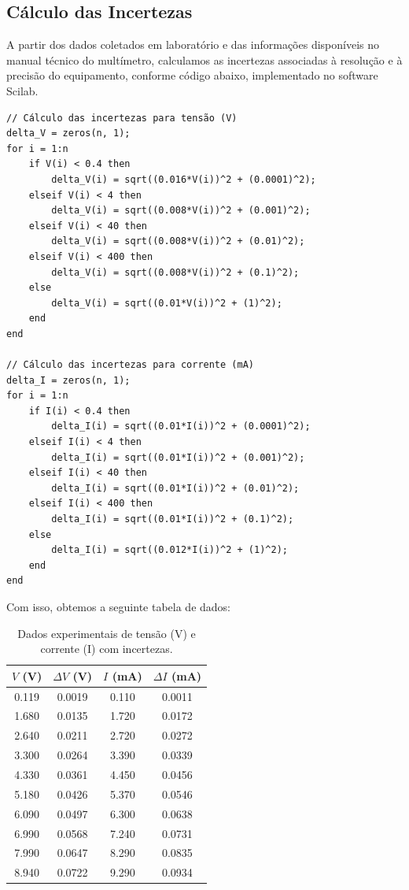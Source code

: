 \documentclass[12pt]{article}
\begin{document}
\subsection*{Cálculo das Incertezas}

A partir dos dados coletados em laboratório e das informações disponíveis no manual técnico do multímetro, calculamos as incertezas associadas à resolução e à precisão do equipamento, conforme código abaixo, implementado no software Scilab.

\begin{verbatim}
// Cálculo das incertezas para tensão (V)
delta_V = zeros(n, 1);
for i = 1:n
    if V(i) < 0.4 then
        delta_V(i) = sqrt((0.016*V(i))^2 + (0.0001)^2);
    elseif V(i) < 4 then
        delta_V(i) = sqrt((0.008*V(i))^2 + (0.001)^2);
    elseif V(i) < 40 then
        delta_V(i) = sqrt((0.008*V(i))^2 + (0.01)^2);
    elseif V(i) < 400 then
        delta_V(i) = sqrt((0.008*V(i))^2 + (0.1)^2);
    else
        delta_V(i) = sqrt((0.01*V(i))^2 + (1)^2);
    end
end

// Cálculo das incertezas para corrente (mA)
delta_I = zeros(n, 1);
for i = 1:n
    if I(i) < 0.4 then
        delta_I(i) = sqrt((0.01*I(i))^2 + (0.0001)^2);
    elseif I(i) < 4 then
        delta_I(i) = sqrt((0.01*I(i))^2 + (0.001)^2);
    elseif I(i) < 40 then
        delta_I(i) = sqrt((0.01*I(i))^2 + (0.01)^2);
    elseif I(i) < 400 then
        delta_I(i) = sqrt((0.01*I(i))^2 + (0.1)^2);
    else
        delta_I(i) = sqrt((0.012*I(i))^2 + (1)^2);
    end
end
\end{verbatim}

Com isso, obtemos a seguinte tabela de dados:

\begin{table}[H]
\centering
\caption{Dados experimentais de tensão (V) e corrente (I) com incertezas.}
\label{tab:dados_experimentais}
\begin{tabular}{cccc}
\toprule
\textbf{$V$ (V)} & \textbf{$\Delta V$ (V)} & \textbf{$I$ (mA)} & \textbf{$\Delta I$ (mA)} \\ 
\midrule
0.119  & 0.0019 & 0.110  & 0.0011 \\ 
1.680  & 0.0135 & 1.720  & 0.0172 \\ 
2.640  & 0.0211 & 2.720  & 0.0272 \\ 
3.300  & 0.0264 & 3.390  & 0.0339 \\ 
4.330  & 0.0361 & 4.450  & 0.0456 \\ 
5.180  & 0.0426 & 5.370  & 0.0546 \\ 
6.090  & 0.0497 & 6.300  & 0.0638 \\ 
6.990  & 0.0568 & 7.240  & 0.0731 \\ 
7.990  & 0.0647 & 8.290  & 0.0835 \\ 
8.940  & 0.0722 & 9.290  & 0.0934 \\ 
\bottomrule
\end{tabular}
\end{table}
\end{document}
